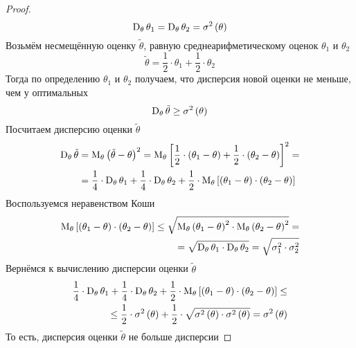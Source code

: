 \begin{proof}
  $$\operatorname{D}_{\theta} \theta_1
    =\operatorname{D}_{\theta} \theta_2
    =\sigma^2\left(\theta\right)$$
  Возьмём несмещённую оценку $\tilde{\theta}$,
  равную среднеарифметическому оценок $\theta_1$ и $\theta_2$
  $$\tilde{\theta}=\frac{1}{2}\cdot\theta_1+\frac{1}{2}\cdot\theta_2$$
  Тогда по определению $\theta_1$ и $\theta_2$ получаем,
  что дисперсия новой оценки не меньше, чем у оптимальных
  \begin{equation}\label{eq:estimator_ge}
    \operatorname{D}_{\theta} \tilde{\theta}\ge\sigma^2\left(\theta\right)
  \end{equation}
  Посчитаем дисперсию оценки $\tilde{\theta}$
  \begin{align*}
  \operatorname{D}_{\theta} \tilde{\theta}
    &=\operatorname{M}_{\theta} \left( \tilde{\theta}-\theta \right)^2
    =\operatorname{M}_{\theta} \left[ \frac{1}{2}\cdot\left( \theta_1-\theta \right)
      +\frac{1}{2}\cdot\left( \theta_2-\theta \right) \right]^2=\\
    &=\frac{1}{4}\cdot\operatorname{D}_{\theta} \theta_1
      +\frac{1}{4}\cdot\operatorname{D}_{\theta} \theta_2
      +\frac{1}{2}\cdot\operatorname{M}_{\theta} \left[ \left( \theta_1-\theta \right)
          \cdot\left( \theta_2-\theta \right) \right]
  \end{align*}
  Воспользуемся неравенством Коши%
  \begin{eqnarray}\label{eq:koshi_eq}
    \operatorname{M}_{\theta} \left[ \left( \theta_1-\theta \right)
      \cdot\left( \theta_2-\theta \right) \right]
    \le\sqrt{\operatorname{M}_{\theta} \left( \theta_1-\theta \right)^2
      \cdot\operatorname{M}_{\theta} \left( \theta_2-\theta \right)^2}=\\
    =\sqrt{\operatorname{D}_{\theta} \theta_1
      \cdot\operatorname{D}_{\theta} \theta_2}
    =\sqrt{\sigma_1^2\cdot\sigma_2^2}\nonumber
  \end{eqnarray}
  Вернёмся к вычислению дисперсии оценки $\tilde{\theta}$
  \begin{align*}
    \frac{1}{4}\cdot\operatorname{D}_{\theta} \theta_1
      +\frac{1}{4}\cdot\operatorname{D}_{\theta} \theta_2
      +\frac{1}{2}\cdot\operatorname{M}_{\theta} \left[ \left( \theta_1-\theta \right)
          \cdot\left( \theta_2-\theta \right) \right]\le\\
    \le\frac{1}{2}\cdot\sigma^2\left( \theta \right)
      +\frac{1}{2}\cdot\sqrt{\sigma^2\left( \theta \right)
        \cdot\sigma^2\left( \theta \right)}
    =\sigma^2\left( \theta \right)
  \end{align*}
  То есть, дисперсия оценки $\tilde{\theta}$ не больше дисперсии

\end{proof}
